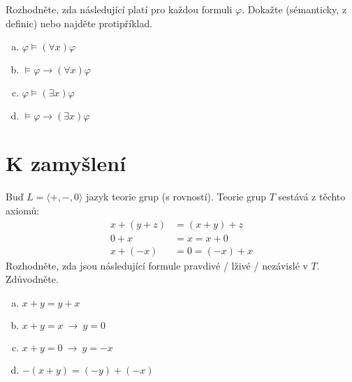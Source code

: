 \begin{problem}
    
    Rozhodněte, zda následující platí pro každou formuli $\varphi$. Dokažte (sémanticky, z definic) nebo najděte protipříklad.
    \begin{enumerate}[(a)]
       \item $\varphi \models (\forall x)\varphi$
       \item $\models \varphi \to (\forall x)\varphi$
       \item $\varphi \models (\exists x)\varphi$
       \item $\models \varphi \to (\exists x)\varphi$
    \end{enumerate}

\end{problem}


\section*{K zamyšlení}


\begin{problem}

    Buď $L=\langle +, -, 0\rangle$ jazyk teorie grup (s rovností). Teorie grup $T$ sestává z těchto axiomů:
    \begin{align*}
    x+(y+z)&=(x+y)+z\\
    0+x&=x=x+0\\
    x+(-x)&=0=(-x)+x
    \end{align*}
    Rozhodněte, zda jsou následující formule pravdivé / lživé / nezávislé v $T$. Zdůvodněte.
    \begin{enumerate}[(a)]
        \item $x+y=y+x$
        \item $x+y=x\ \rightarrow\ y=0$
        \item $x+y=0\ \rightarrow\ y=-x$
        \item $-(x+y)=(-y)+(-x)$
    \end{enumerate}

\end{problem}




